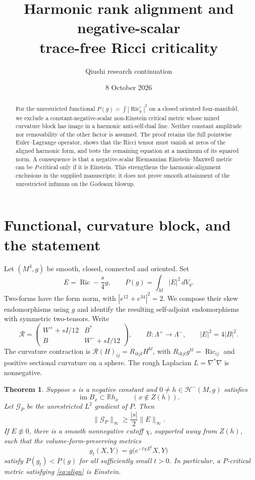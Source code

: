 \documentclass[11pt,a4paper]{article}
\title{Harmonic rank alignment and negative-scalar\\[3pt]trace-free Ricci criticality}
\author{Qiushi research continuation}
\date{8 October 2026}
\newtheorem{theorem}{Theorem}[section]
\theoremstyle{remark}\newtheorem{remark}[theorem]{Remark}
\newcommand{\Ric}{\operatorname{Ric}}
\newcommand{\im}{\operatorname{im}}
\newcommand{\Hharm}{\mathcal H}
\newcommand{\GP}{\mathcal G_P}
\numberwithin{equation}{section}
\begin{document}
\maketitle
\begin{abstract}
For the unrestricted functional $P(g)=\int|\Ric_g^\circ|^2$ on a closed
oriented four-manifold, we exclude a constant-negative-scalar non-Einstein
critical metric whose mixed curvature block has image in a harmonic
anti-self-dual line. Neither constant amplitude nor removability of the other
factor is assumed. The proof retains the full pointwise Euler--Lagrange
operator, shows that the Ricci tensor must vanish at zeros of the aligned
harmonic form, and tests the remaining equation at a maximum of its squared
norm. A consequence is that a negative-scalar Riemannian Einstein--Maxwell
metric can be $P$-critical only if it is Einstein. This strengthens the
harmonic-alignment exclusions in the supplied manuscripts; it does not prove
smooth attainment of the unrestricted infimum on the Godeaux blowup.
\end{abstract}

\section{Functional, curvature block, and the statement}
Let $(M^4,g)$ be smooth, closed, connected and oriented. Set
\[
 E=\Ric-\frac{s}{4}g,\qquad P(g)=\int_M|E|^2\,dV_g.
\]
Two-forms have the form norm, with $|e^{12}+e^{34}|^2=2$.
We compose their skew endomorphisms using $g$ and identify the resulting
self-adjoint endomorphisms with symmetric two-tensors. Write
\[
 \mathcal R=\begin{pmatrix}W^++sI/12&B^*\\B&W^-+sI/12\end{pmatrix},
 \qquad B:\Lambda^+\longrightarrow\Lambda^-,\qquad |E|^2=4|B|^2.
\]
The curvature contraction is $\mathscr R(H)_{ij}=R_{ikjl}H^{kl}$,
with $R_{ikjl}g^{kl}=\Ric_{ij}$ and positive sectional curvature on a sphere.
The rough Laplacian $L=\nabla^*\nabla$ is nonnegative.

\begin{theorem}\label{thm:main}
Suppose $s$ is a negative constant and $0\ne h\in\Hharm^-(M,g)$ satisfies
\begin{equation}\label{eq:align}
 \im B_x\subset\mathbb R h_x\qquad(x\notin Z(h)).
\end{equation}
Let $\GP$ be the unrestricted $L^2$ gradient of $P$. Then
\begin{equation}\label{eq:infty}
 \boxed{\|\GP\|_\infty\ge\frac{|s|}{2}\|E\|_\infty.}
\end{equation}
If $E\not\equiv0$, there is a smooth nonnegative cutoff $\chi$, supported
away from $Z(h)$, such that the volume-form-preserving metrics
\begin{equation}\label{eq:path}
 g_t(X,Y)=g\bigl(e^{-t\chi E^\sharp}X,Y\bigr)
\end{equation}
satisfy $P(g_t)<P(g)$ for all sufficiently small $t>0$.
In particular, a $P$-critical metric satisfying \eqref{eq:align} is Einstein.
\end{theorem}
\end{document}
